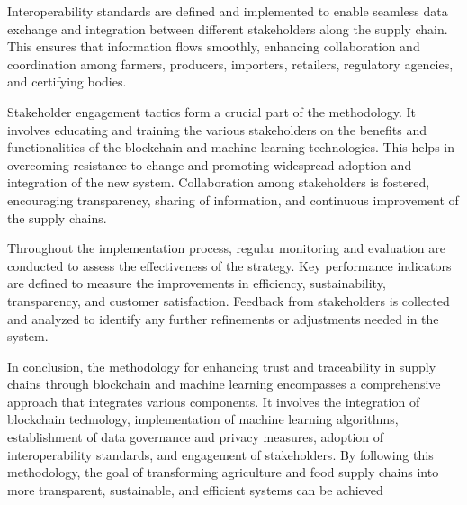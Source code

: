 {Interoperability standards are defined and implemented to enable seamless data exchange and integration between different stakeholders along the supply chain. This ensures that information flows smoothly, enhancing collaboration and coordination among farmers, producers, importers, retailers, regulatory agencies, and certifying bodies.

Stakeholder engagement tactics form a crucial part of the methodology. It involves educating and training the various stakeholders on the benefits and functionalities of the blockchain and machine learning technologies. This helps in overcoming resistance to change and promoting widespread adoption and integration of the new system. Collaboration among stakeholders is fostered, encouraging transparency, sharing of information, and continuous improvement of the supply chains.

Throughout the implementation process, regular monitoring and evaluation are conducted to assess the effectiveness of the strategy. Key performance indicators are defined to measure the improvements in efficiency, sustainability, transparency, and customer satisfaction. Feedback from stakeholders is collected and analyzed to identify any further refinements or adjustments needed in the system.

In conclusion, the methodology for enhancing trust and traceability in supply chains through blockchain and machine learning encompasses a comprehensive approach that integrates various components. It involves the integration of blockchain technology, implementation of machine learning algorithms, establishment of data governance and privacy measures, adoption of interoperability standards, and engagement of stakeholders. By following this methodology, the goal of transforming agriculture and food supply chains into more transparent, sustainable, and efficient systems can be achieved}


